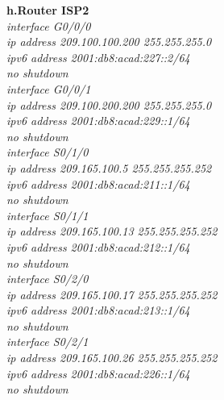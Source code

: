 \documentclass[12pt,a4paper]{report}
\begin{document}
\hspace*{1cm}\textbf{h.Router ISP2} \\
\hspace*{2cm}\textit{interface G0/0/0\\
\hspace*{2cm}ip address 209.100.100.200 255.255.255.0\\
\hspace*{2cm}ipv6 address 2001:db8:acad:227::2/64\\
\hspace*{2cm}no shutdown\\
\hspace*{2cm}interface G0/0/1\\
\hspace*{2cm}ip address 209.100.200.200 255.255.255.0\\
\hspace*{2cm}ipv6 address 2001:db8:acad:229::1/64\\
\hspace*{2cm}no shutdown\\
\hspace*{2cm}interface S0/1/0\\
\hspace*{2cm}ip address 209.165.100.5 255.255.255.252\\
\hspace*{2cm}ipv6 address 2001:db8:acad:211::1/64\\
\hspace*{2cm}no shutdown\\
\hspace*{2cm}interface S0/1/1\\
\hspace*{2cm}ip address 209.165.100.13 255.255.255.252\\
\hspace*{2cm}ipv6 address 2001:db8:acad:212::1/64\\
\hspace*{2cm}no shutdown\\
\hspace*{2cm}interface S0/2/0\\
\hspace*{2cm}ip address 209.165.100.17 255.255.255.252\\
\hspace*{2cm}ipv6 address 2001:db8:acad:213::1/64\\
\hspace*{2cm}no shutdown\\
\hspace*{2cm}interface S0/2/1\\
\hspace*{2cm}ip address 209.165.100.26 255.255.255.252\\
\hspace*{2cm}ipv6 address 2001:db8:acad:226::1/64\\
\hspace*{2cm}no shutdown\\}
\end{document}
